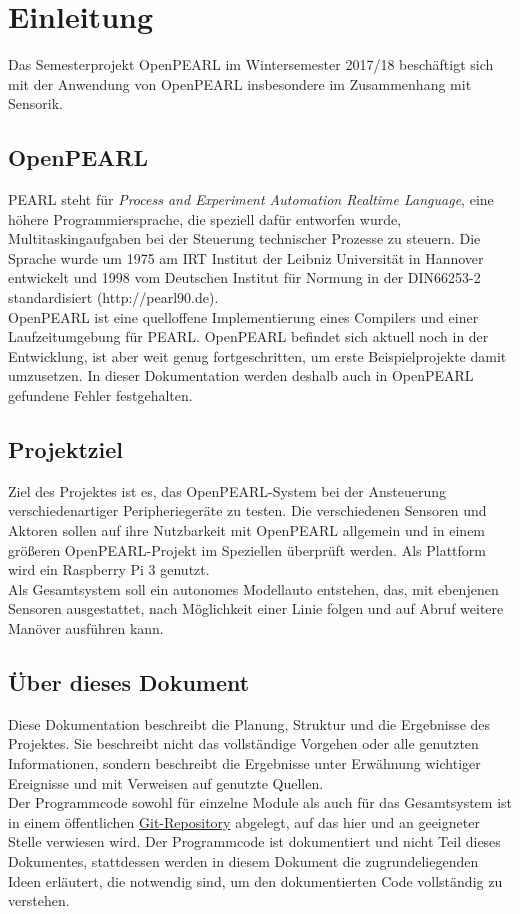 \chapter{Einleitung}

	Das Semesterprojekt OpenPEARL im Wintersemester 2017/18 beschäftigt sich mit der Anwendung von OpenPEARL insbesondere im Zusammenhang mit Sensorik. 
	
	\section{OpenPEARL}
	PEARL steht für \emph{Process and Experiment Automation Realtime Language}, eine höhere Programmiersprache, die speziell dafür entworfen wurde, Multitaskingaufgaben bei der Steuerung technischer Prozesse zu steuern. Die Sprache wurde um 1975 am IRT Institut der Leibniz Universität in Hannover entwickelt und 1998 vom Deutschen Institut für Normung in der DIN66253-2 standardisiert (http://pearl90.de).\\
	OpenPEARL ist eine quelloffene Implementierung eines Compilers und einer Laufzeitumgebung für PEARL. OpenPEARL befindet sich aktuell noch in der Entwicklung, ist aber weit genug fortgeschritten, um erste Beispielprojekte damit umzusetzen. In dieser Dokumentation werden deshalb auch in OpenPEARL gefundene Fehler festgehalten.
	
	\section{Projektziel}
	Ziel des Projektes ist es, das OpenPEARL-System bei der Ansteuerung verschiedenartiger Peripheriegeräte zu testen. Die verschiedenen Sensoren und Aktoren sollen auf ihre Nutzbarkeit mit OpenPEARL allgemein und in einem größeren OpenPEARL-Projekt im Speziellen überprüft werden. Als Plattform wird ein Raspberry Pi 3 genutzt. \\
	Als Gesamtsystem soll ein autonomes Modellauto entstehen, das, mit ebenjenen Sensoren ausgestattet, nach Möglichkeit einer Linie folgen und auf Abruf weitere Manöver ausführen kann.
	
	\section{Über dieses Dokument}
	Diese Dokumentation beschreibt die Planung, Struktur und die Ergebnisse des Projektes. Sie beschreibt nicht das vollständige Vorgehen oder alle genutzten Informationen, sondern beschreibt die Ergebnisse unter Erwähnung wichtiger Ereignisse und mit Verweisen auf genutzte Quellen. \\
	Der Programmcode sowohl für einzelne Module als auch für das Gesamtsystem ist in einem öffentlichen \href{https://github.com/OpenPearl-HFUWPV1718/SensorCar}{Git-Repository} abgelegt, auf das hier und an geeigneter Stelle verwiesen wird. Der Programmcode ist dokumentiert und nicht Teil dieses Dokumentes, stattdessen werden in diesem Dokument die zugrundeliegenden Ideen erläutert, die notwendig sind, um den dokumentierten Code vollständig zu verstehen.
	
	
	